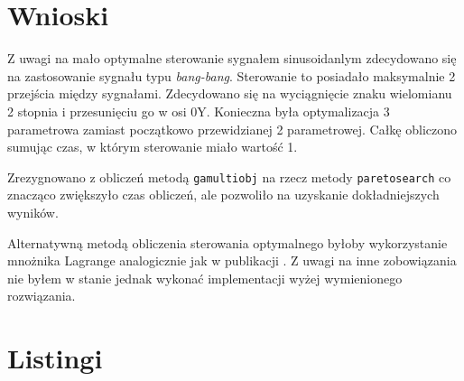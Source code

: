 \documentclass[a4paper]{article}
\begin{document}
\section{Wnioski}
Z uwagi na mało optymalne sterowanie sygnałem sinusoidanlym zdecydowano się na zastosowanie sygnału typu \textit{bang-bang}.
Sterowanie to posiadało maksymalnie 2 przejścia między sygnałami. 
Zdecydowano się na wyciągnięcie znaku wielomianu 2 stopnia i przesunięciu go w osi 0Y.
Konieczna była optymalizacja 3 parametrowa zamiast początkowo przewidzianej 2 parametrowej. 
Całkę obliczono sumując czas, w którym sterowanie miało wartość 1. 


Zrezygnowano z obliczeń metodą \texttt{gamultiobj} na rzecz metody \texttt{paretosearch} co znacząco zwiększyło czas obliczeń, ale pozwoliło na uzyskanie dokładniejszych wyników.

Alternatywną metodą obliczenia sterowania optymalnego byłoby wykorzystanie mnożnika Lagrange analogicznie jak w publikacji \cite{kaya2004computations}.
Z uwagi na inne zobowiązania nie byłem w stanie jednak wykonać implementacji wyżej wymienionego rozwiązania. 


\newpage
\section{Listingi}



\newpage
\printbibliography
\end{document}
